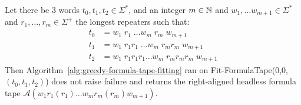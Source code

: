 

\begin{theorem}\label{th:greedy-formula-tape-fitting}
    Let there be 3 words $t_0, t_1, t_2 \in \Sigma^*$, and an integer $m\in\mathbb{N}$ and $w_1, \dots w_{m+1} \in \Sigma^*$ and $r_1, \dots, r_m \in\Sigma^+$ the longest repeaters such that:
    \begin{align*}
        t_0 & = w_1\; r_1\; \dots w_m\; r_m\; w_{m+1}               \\
        t_1 & = w_1\; r_1r_1\; \dots w_m\; r_m r_m\; w_{m+1}        \\
        t_2 & = w_1\; r_1 r_1 r_1 \dots w_m\; r_m r_m r_m\; w_{m+1}
    \end{align*}
    Then Algorithm~\ref{alg:greedy-formula-tape-fitting} ran on {\sc Fit-FormulaTape}(0,0,$(t_0,t_1,t_2)$) does not raise failure and returns the right-aligned headless formula tape $\mathcal{A}(w_1 r_1 (r_1) \dots w_m r_m (r_m) w_{m+1})$.

\end{theorem}
